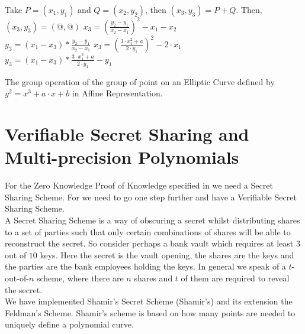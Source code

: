 \documentclass[ %
                    author={Nicholas Tutte},
                supervisor={Prof. Nigel Smart},
                    degree={MEng},
                     title={Secure Two Party Computation},
                  subtitle={A practical comparison of recent protocols},
                      type={Research - GG1K},
                      year={2015} ]{dissertation}
\begin{document}
			\begin{mdframed}
				\begin{algorithm}[H]
					Take $P = (x_1, y_1)$ and $Q = (x_2, y_2)$, then $(x_3, y_3) = P + Q$. Then,\\[0.15cm]
					{
						$(x_3, y_3) = (@, @)$
					}
					{
						{
							$x_3 = (\frac{y_2 - y_1}{x_2 - x_1})^2 - x_1 - x_2$\\
							$y_3 = (x_1 - x_3) * \frac{y_2 - y_1}{x_2 - x_1}$
						}
						{
							$x_3 = (\frac{3\cdot x_1^2 + a}{2 \cdot y_1}) ^ 2 - 2\cdot x_1$\\
							$y_3 = (x_1 - x_3) * \frac{3 \cdot x_1^2 + a}{2 \cdot y_1} - y_1$
						}
					}

					\caption{The group operation of the group of point on an Elliptic Curve defined by $y^2 = x^3 + a \cdot x + b$ in Affine Representation. \label{Algo:ECC_GroupOp}}
				\end{algorithm}
			\end{mdframed}

		\section{Verifiable Secret Sharing and Multi-precision Polynomials}

			For the Zero Knowledge Proof of Knowledge specified in \cite{LindellAndPinkas2011} we need a Secret Sharing Scheme. For \cite{Katz_Symm_CnC_2013} we need to go one step further and have a Verifiable Secret Sharing Scheme.\\

			A Secret Sharing Scheme is a way of obscuring a secret whilst distributing shares to a set of parties such that only certain combinations of shares will be able to reconstruct the secret. So consider perhaps a bank vault which requires at least $3$ out of $10$ keys. Here the secret is the vault opening, the shares are the keys and the parties are the bank employees holding the keys. In general we speak of a $t$-out-of-$n$ scheme, where there are $n$ shares and $t$ of them are required to reveal the secret.\\

			We have implemented Shamir's Secret Scheme (Shamir's) and its extension the Feldman's Scheme. Shamir's scheme is based on how many points are needed to uniquely define a polynomial curve.\\
\end{document}
